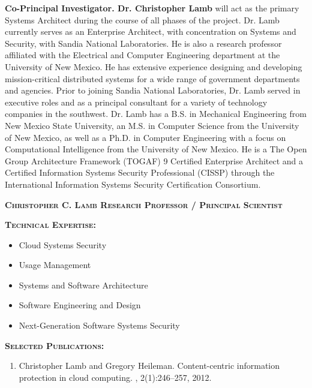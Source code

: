 \documentclass{sbir}
\begin{document}
{{{\bf Co-Principal Investigator. Dr. Christopher Lamb} will act as the primary Systems Architect during the course of all phases of the project. Dr. Lamb currently serves as an Enterprise Architect, with concentration on Systems and Security, with Sandia National Laboratories. He is also a research professor affiliated with the Electrical and Computer Engineering department at the University of New Mexico. He has extensive experience designing and developing mission-critical distributed systems for a wide range of government departments and agencies. Prior to joining Sandia National Laboratories, Dr. Lamb served in executive roles and as a principal consultant for a variety of technology companies in the southwest. Dr. Lamb has a B.S. in Mechanical Engineering from New Mexico State University, an M.S. in Computer Science from the University of New Mexico, as well as a Ph.D. in Computer Engineering with a focus on Computational Intelligence from the University of New Mexico. He is a The Open Group Architecture Framework (TOGAF) 9 Certified Enterprise Architect and a Certified Information Systems Security Professional (CISSP) through the International Information Systems Security Certification Consortium.

\textbf{\textsc{Christopher C. Lamb \hfill Research Professor / Principal Scientist}}

\vspace{-18pt}
{\textcolor{black}{\makebox[6.5in]{\hrulefill}} 
\textbf{\textsc{Technical Expertise:}}
\vspace{-8pt}
\begin{multicols}{2}
 \begin{itemize}
  \item Cloud Systems Security
  \item Usage Management
  \item Systems and Software Architecture
  \item Software Engineering and Design
  \item Next-Generation Software Systems Security	
 \end{itemize}
\end{multicols}

\vspace{-16pt}
\textbf{\textsc{Selected Publications:}}
\begin{enumerate}
\item Christopher Lamb and Gregory Heileman.
\newblock Content-centric information protection in cloud computing.
,
  2(1):246--257, 2012.


\end{enumerate}}}}
\end{document}
